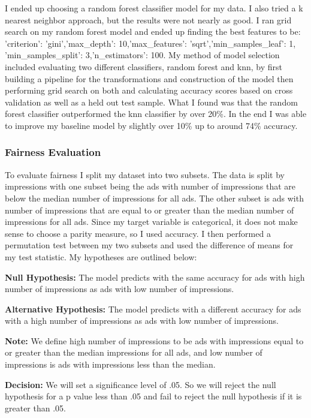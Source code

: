 \documentclass[11pt]{article}
\begin{document}
I ended up choosing a random forest classifier model for my data. I also
tried a k nearest neighbor approach, but the results were not nearly as
good. I ran grid search on my random forest model and ended up finding
the best features to be: 'criterion': 'gini','max\_depth':
10,'max\_features': 'sqrt','min\_samples\_leaf': 1,
'min\_samples\_split': 3,'n\_estimators': 100. My method of model
selection included evaluating two different classifiers, random forest
and knn, by first building a pipeline for the transformations and
construction of the model then performing grid search on both and
calculating accuracy scores based on cross validation as well as a held
out test sample. What I found was that the random forest classifier
outperformed the knn classifier by over 20\%. In the end I was able to
improve my baseline model by slightly over 10\% up to around 74\%
accuracy.

\subsubsection{Fairness Evaluation}\label{fairness-evaluation}

To evaluate fairness I split my dataset into two subsets. The data is
split by impressions with one subset being the ads with number of
impressions that are below the median number of impressions for all ads.
The other subset is ads with number of impressions that are equal to or
greater than the median number of impressions for all ads. Since my
target variable is categorical, it does not make sense to choose a
parity measure, so I used accuracy. I then performed a permutation test
between my two subsets and used the difference of means for my test
statistic. My hypotheses are outlined below:

\textbf{Null Hypothesis:} The model predicts with the same accuracy for
ads with high number of impressions as ads with low number of
impressions.

\textbf{Alternative Hypothesis:} The model predicts with a different
accuracy for ads with a high number of impressions as ads with low
number of impressions.

\textbf{Note:} We define high number of impressions to be ads with
impressions equal to or greater than the median impressions for all ads,
and low number of impressions is ads with impressions less than the
median.

\textbf{Decision:} We will set a significance level of .05. So we will
reject the null hypothesis for a p value less than .05 and fail to
reject the null hypothesis if it is greater than .05.
\end{document}
